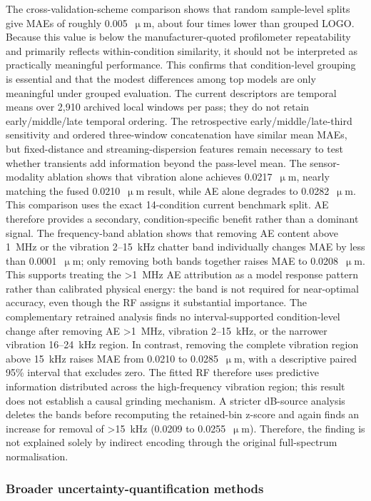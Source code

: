 The cross-validation-scheme comparison shows that random sample-level
splits give MAEs of roughly 0.005~\(\upmu\)m, about four times lower than
grouped LOGO. Because this value is below the manufacturer-quoted
profilometer repeatability and primarily reflects within-condition similarity, it
should not be interpreted as practically meaningful performance. This
confirms that condition-level grouping is essential and that the modest
differences among top models are only meaningful under grouped evaluation.
The current descriptors are temporal means over 2,910 archived local windows per pass; they do not retain early/middle/late temporal ordering. The retrospective early/middle/late-third sensitivity and ordered three-window concatenation have similar mean MAEs, but fixed-distance and streaming-dispersion features remain necessary to test whether transients add information beyond the pass-level mean. The sensor-modality ablation shows that
vibration alone achieves 0.0217~\(\upmu\)m, nearly matching the fused
0.0210~\(\upmu\)m result, while AE alone degrades to 0.0282~\(\upmu\)m.
This comparison uses the exact 14-condition current benchmark split. AE therefore
provides a secondary, condition-specific benefit rather than a dominant
signal. The frequency-band ablation shows that removing AE content above
1~MHz or the vibration 2--15~kHz chatter band individually changes MAE by
less than 0.0001~\(\upmu\)m; only removing both bands together raises MAE
to 0.0208~\(\upmu\)m. This supports treating the >1~MHz AE attribution as
a model response pattern rather than calibrated physical energy: the
band is not required for near-optimal accuracy, even though the RF
assigns it substantial importance. The complementary retrained analysis
finds no interval-supported condition-level change after removing AE >1~MHz,
vibration 2--15~kHz, or the narrower vibration 16--24~kHz region. In
contrast, removing the complete vibration region above 15~kHz raises MAE
from 0.0210 to 0.0285~\(\upmu\)m, with a descriptive paired 95\% interval
that excludes zero. The fitted RF therefore uses predictive information
distributed across the high-frequency vibration region; this result does
not establish a causal grinding mechanism. A stricter dB-source analysis
deletes the bands before recomputing the retained-bin z-score and again finds
an increase for removal of >15~kHz (0.0209 to 0.0255~\(\upmu\)m). Therefore,
the finding is not explained solely by indirect encoding through the original
full-spectrum normalisation.

\subsubsection{Broader uncertainty-quantification
methods}\label{broader-uq}

